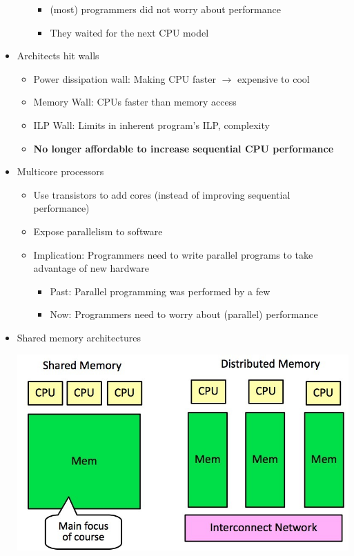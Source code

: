 \documentclass[a4paper]{article}
\begin{document}
\begin{itemize}
\begin{itemize}
\begin{itemize}
\item (most) programmers did not worry about performance
\item They waited for the next CPU model
\end{itemize}
\end{itemize}
\item Architects hit walls 
\begin{itemize}
\item Power dissipation wall: Making CPU faster $\to$ expensive to cool
\item Memory Wall: CPUs faster than memory access
\item ILP Wall: Limits in inherent program's ILP, complexity
\item \textbf{No longer affordable to increase sequential CPU performance}
\end{itemize}
\item Multicore processors
\begin{itemize}
\item Use transistors to add cores (instead of improving sequential performance)
\item Expose parallelism to software
\item Implication: Programmers need to write parallel programs to take advantage of new hardware
\begin{itemize}
\item Past: Parallel programming was performed by a few
\item Now: Programmers need to worry about (parallel) performance
\end{itemize}
\end{itemize}
\item Shared memory architectures 

\begin{center}
\includegraphics[scale=0.4]{Figures/sharedDistributedMemoryArchitectures.jpg}
\end{center}


\end{itemize}
\end{document}
